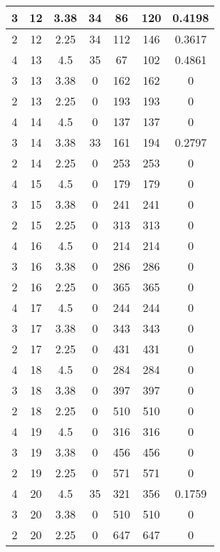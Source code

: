 \documentclass[letterpaper, 12pt]{article}
\begin{document}
\begin{longtable}{|c|c|c|c|c|c|c|}
\hline
3 & 12 & 3.38 & 34 & 86 & 120 & 0.4198 \\
\hline
2 & 12 & 2.25 & 34 & 112 & 146 & 0.3617 \\
\hline
4 & 13 & 4.5 & 35 & 67 & 102 & 0.4861 \\
\hline
3 & 13 & 3.38 & 0 & 162 & 162 & 0 \\
\hline
2 & 13 & 2.25 & 0 & 193 & 193 & 0 \\
\hline
4 & 14 & 4.5 & 0 & 137 & 137 & 0 \\
\hline
3 & 14 & 3.38 & 33 & 161 & 194 & 0.2797 \\
\hline
2 & 14 & 2.25 & 0 & 253 & 253 & 0 \\
\hline
4 & 15 & 4.5 & 0 & 179 & 179 & 0 \\
\hline
3 & 15 & 3.38 & 0 & 241 & 241 & 0 \\
\hline
2 & 15 & 2.25 & 0 & 313 & 313 & 0 \\
\hline
4 & 16 & 4.5 & 0 & 214 & 214 & 0 \\
\hline
3 & 16 & 3.38 & 0 & 286 & 286 & 0 \\
\hline
2 & 16 & 2.25 & 0 & 365 & 365 & 0 \\
\hline
4 & 17 & 4.5 & 0 & 244 & 244 & 0 \\
\hline
3 & 17 & 3.38 & 0 & 343 & 343 & 0 \\
\hline
2 & 17 & 2.25 & 0 & 431 & 431 & 0 \\
\hline
4 & 18 & 4.5 & 0 & 284 & 284 & 0 \\
\hline
3 & 18 & 3.38 & 0 & 397 & 397 & 0 \\
\hline
2 & 18 & 2.25 & 0 & 510 & 510 & 0 \\
\hline
4 & 19 & 4.5 & 0 & 316 & 316 & 0 \\
\hline
3 & 19 & 3.38 & 0 & 456 & 456 & 0 \\
\hline
2 & 19 & 2.25 & 0 & 571 & 571 & 0 \\
\hline
4 & 20 & 4.5 & 35 & 321 & 356 & 0.1759 \\
\hline
3 & 20 & 3.38 & 0 & 510 & 510 & 0 \\
\hline
2 & 20 & 2.25 & 0 & 647 & 647 & 0 \\
\hline
\end{longtable}
\end{document}
